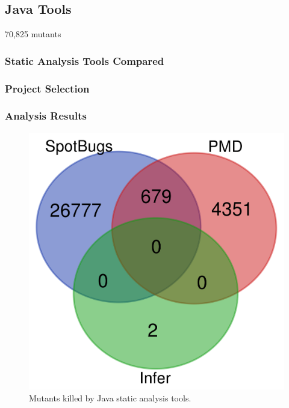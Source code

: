 \subsection{Java Tools}

70,825 mutants

\subsubsection{Static Analysis Tools Compared}

\subsubsection{Project Selection}

\subsubsection{Analysis Results}


\begin{figure}
  \includegraphics[width=\columnwidth]{java.png}
  \caption{Mutants killed by Java static analysis tools.}
  \label{fig:javavenn}
\end{figure}

